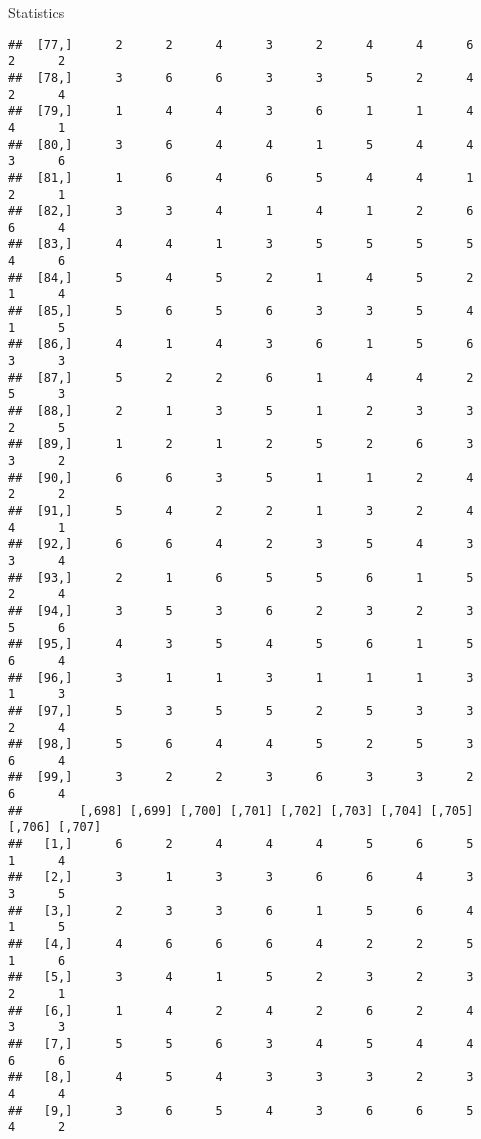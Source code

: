 \documentclass[
  ignorenonframetext,
]{beamer}
\begin{document}
\begin{frame}[fragile]{Statistics}
\begin{verbatim}
##  [77,]      2      2      4      3      2      4      4      6      2      2
##  [78,]      3      6      6      3      3      5      2      4      2      4
##  [79,]      1      4      4      3      6      1      1      4      4      1
##  [80,]      3      6      4      4      1      5      4      4      3      6
##  [81,]      1      6      4      6      5      4      4      1      2      1
##  [82,]      3      3      4      1      4      1      2      6      6      4
##  [83,]      4      4      1      3      5      5      5      5      4      6
##  [84,]      5      4      5      2      1      4      5      2      1      4
##  [85,]      5      6      5      6      3      3      5      4      1      5
##  [86,]      4      1      4      3      6      1      5      6      3      3
##  [87,]      5      2      2      6      1      4      4      2      5      3
##  [88,]      2      1      3      5      1      2      3      3      2      5
##  [89,]      1      2      1      2      5      2      6      3      3      2
##  [90,]      6      6      3      5      1      1      2      4      2      2
##  [91,]      5      4      2      2      1      3      2      4      4      1
##  [92,]      6      6      4      2      3      5      4      3      3      4
##  [93,]      2      1      6      5      5      6      1      5      2      4
##  [94,]      3      5      3      6      2      3      2      3      5      6
##  [95,]      4      3      5      4      5      6      1      5      6      4
##  [96,]      3      1      1      3      1      1      1      3      1      3
##  [97,]      5      3      5      5      2      5      3      3      2      4
##  [98,]      5      6      4      4      5      2      5      3      6      4
##  [99,]      3      2      2      3      6      3      3      2      6      4
##        [,698] [,699] [,700] [,701] [,702] [,703] [,704] [,705] [,706] [,707]
##   [1,]      6      2      4      4      4      5      6      5      1      4
##   [2,]      3      1      3      3      6      6      4      3      3      5
##   [3,]      2      3      3      6      1      5      6      4      1      5
##   [4,]      4      6      6      6      4      2      2      5      1      6
##   [5,]      3      4      1      5      2      3      2      3      2      1
##   [6,]      1      4      2      4      2      6      2      4      3      3
##   [7,]      5      5      6      3      4      5      4      4      6      6
##   [8,]      4      5      4      3      3      3      2      3      4      4
##   [9,]      3      6      5      4      3      6      6      5      4      2

\end{verbatim}
\end{frame}
\end{document}
